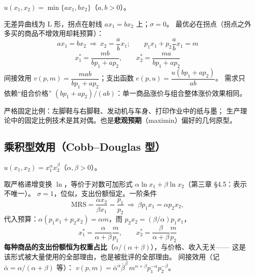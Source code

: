 $u(x_1,x_2)=\min\{ax_1,bx_2\}$（$a,b>0$）。

无差异曲线为 L 形，拐点在射线 $ax_1=bx_2$ 上；$\sigma=0$。
最优必在拐点（拐点之外多买的商品不增效用却耗预算）：
\[
ax_1=bx_2\ \Longrightarrow\ x_2=\frac{a}{b}x_1;\qquad
p_1x_1+p_2\frac{a}{b}x_1=m
\]
\[
\boxed{\ x_1^*=\frac{mb}{bp_1+ap_2},\qquad x_2^*=\frac{ma}{bp_1+ap_2}\ }
\]
间接效用 $v(p,m)=\dfrac{mab}{bp_1+ap_2}$；支出函数 $e(p,u)=\dfrac{u(bp_1+ap_2)}{ab}$。
需求只依赖“组合价格” $(bp_1+ap_2)/(ab)$：单一商品涨价与组合整体涨价效果相同。

\begin{center}
\end{center}

严格固定比例：左脚鞋与右脚鞋、发动机与车身、打印作业中的纸与墨；
生产理论中的固定比例技术是其对偶。也是\textbf{悲观预期}（maximin）偏好的几何原型。

\subsection{乘积型效用（Cobb--Douglas 型）}

$u(x_1,x_2)=x_1^{\alpha}x_2^{\beta}$（$\alpha,\beta>0$）。

取严格递增变换 $\ln$，等价于对数可加形式 $\alpha\ln x_1+\beta\ln x_2$（第三章 §4.5：表示不唯一）。
$\sigma=1$，位似，支出份额恒定。一阶条件
\[
\mathrm{MRS}=\frac{\alpha x_2}{\beta x_1}=\frac{p_1}{p_2}
\ \Longrightarrow\ \beta p_1x_1=\alpha p_2x_2,
\]
代入预算：$\alpha(p_1x_1+p_2x_2)=\alpha m$，而 $p_2x_2=(\beta/\alpha)p_1x_1$，
\[
\boxed{\ x_1^*=\frac{\alpha}{\alpha+\beta}\frac{m}{p_1},\qquad x_2^*=\frac{\beta}{\alpha+\beta}\frac{m}{p_2}\ }
\]
\textbf{每种商品的支出份额恒为权重占比}（$\alpha/(\alpha+\beta)$），与价格、收入无关——
这是该形式被大量使用的全部理由，也是被批评的全部理由。
间接效用（记 $\bar\alpha=\alpha/(\alpha+\beta)$ 等）：
$v(p,m)=\bar\alpha^{\alpha}\bar\beta^{\beta}\,m^{\alpha+\beta}p_1^{-\alpha}p_2^{-\beta}$。

